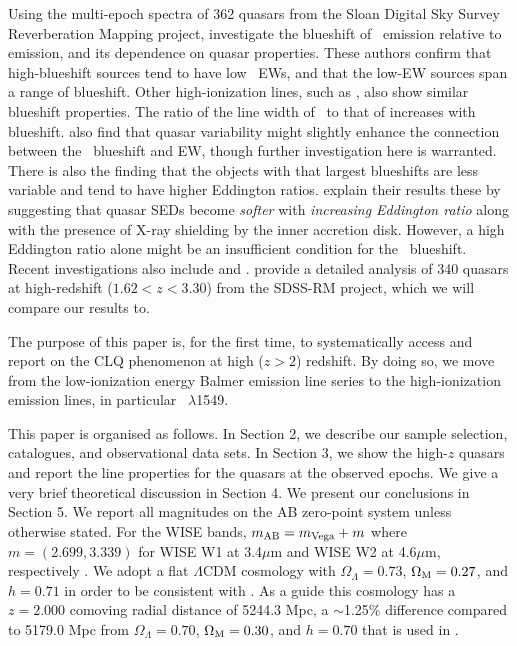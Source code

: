 \documentclass[a4paper,fleqn,usenatbib]{mnras}
\begin{document}
Using the multi-epoch spectra of 362 quasars from the Sloan Digital
Sky Survey Reverberation Mapping \citep[SDSS-RM; ][]{Shen2015,
Shen2019} project, \citet{Sun2018} investigate the blueshift of \civ\
emission relative to \mgii emission, and its dependence on quasar
properties.  These authors confirm that high-blueshift sources tend to
have low \civ\ EWs, and that the low-EW sources span a range of
blueshift. Other high-ionization lines, such as \heii, also show
similar blueshift properties. The ratio of the line width of \civ\ to
that of \mgii increases with blueshift.  \citet{Sun2018} also find
that quasar variability might slightly enhance the connection between
the \civ\ blueshift and EW, though further investigation here is
warranted.  There is also the finding that the objects with that
largest blueshifts are less variable and tend to have higher Eddington
ratios.  \citet{Sun2018} explain their results these by suggesting
that quasar SEDs become {\it softer} with {\it increasing Eddington
ratio} along with the presence of X-ray shielding by the inner
accretion disk.  However, a high Eddington ratio alone might be an
insufficient condition for the \civ\ blueshift.
Recent investigations also include \citet{Meyer2019} and \citet{Doan2019}. 
\citet{Dyer2019} provide a detailed analysis of 340 quasars at high-redshift
($1.62<z<3.30$) from the SDSS-RM project, which we will compare our
results to.


The purpose of this paper is, for the first time, to systematically access and 
report on the CLQ phenomenon at high ($z>2$) redshift. By doing so, we move from the low-ionization 
energy Balmer emission line series to the high-ionization emission 
lines, in particular \civ\ $\lambda$1549. 

This paper is organised as follows. In Section 2, we describe our
sample selection, catalogues, and observational data sets.  In Section 3,
we show the high-$z$ quasars and report the line properties for the
quasars at the observed epochs.  We give a very brief theoretical
discussion in Section 4. We present our conclusions in Section 5.  We
report all magnitudes on the AB zero-point system \citep{Oke_Gunn1983,
Fukugita1996} unless otherwise stated. For the WISE bands,
$m_{\rm AB} = m_{\rm Vega} + m$ where $m = (2.699, 3.339)$ for WISE W1
at 3.4$\mu$m and WISE W2 at 4.6$\mu$m, respectively
\citep{Cutri2011}.
We adopt a flat $\Lambda$CDM cosmology with $\Omega_{\Lambda} = 0.73$,
$\Omega_{\rm M} = 0.27$, and $h = 0.71$ in order to be consistent with
\citet{Hamann2017}. As a guide this cosmology has a $z=2.000$
comoving radial distance of 5244.3 Mpc, a $\sim$1.25\% difference
compared to 5179.0 Mpc from $\Omega_{\Lambda} = 0.70$, $\Omega_{\rm M}
= 0.30$, and $h = 0.70$ that is used in \citet{Shen2011}.
\end{document}
